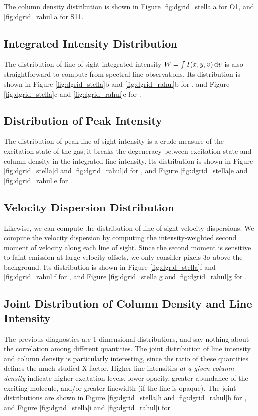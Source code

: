 The column density distribution is shown in Figure \ref{fig:dgrid_stella}a for O1, and \ref{fig:dgrid_rahul}a for S11.

\subsection{Integrated Intensity Distribution}
The distribution of line-of-sight integrated intensity $W=\int I(x, y, v)\, {\rm d}v$  is also straightforward to compute from spectral line observations. Its distribution is shown in Figure  \ref{fig:dgrid_stella}b and \ref{fig:dgrid_rahul}b for \coa, and  Figure \ref{fig:dgrid_stella}c and \ref{fig:dgrid_rahul}c for \coc.

\subsection{Distribution of Peak Intensity}
The distribution of peak line-of-sight intensity is a crude measure of the excitation state of the gas; it breaks the degeneracy between excitation state and column density in the integrated line intensity. Its distribution is shown in Figure  \ref{fig:dgrid_stella}d and \ref{fig:dgrid_rahul}d for \coa, and  Figure \ref{fig:dgrid_stella}e and \ref{fig:dgrid_rahul}e for \coc.

\subsection{Velocity Dispersion Distribution}
Likewise, we can compute the distribution of line-of-sight velocity dispersions. We compute the velocity dispersion by computing the intensity-weighted second moment of velocity along each line of sight. Since the second moment is sensitive to faint emission at large velocity offsets, we only consider pixels 3$\sigma$ above the background. Its distribution is shown in Figure  \ref{fig:dgrid_stella}f and \ref{fig:dgrid_rahul}f for \coa, and  Figure \ref{fig:dgrid_stella}g and \ref{fig:dgrid_rahul}g for \coc.

\subsection{Joint Distribution of Column Density and Line Intensity}
The previous diagnostics are 1-dimensional distributions, and say nothing about the correlation among different quantities. The joint distribution of line intensity and column density is particularly interesting, since the ratio of these quantities defines the much-studied X-factor. Higher line intensities \textit{at a given column density} indicate higher excitation levels, lower opacity, greater abundance of the exciting molecule, and/or greater linewidth (if the line is opaque). The joint distributions are shown in Figure  \ref{fig:dgrid_stella}h and \ref{fig:dgrid_rahul}h for \coa, and  Figure \ref{fig:dgrid_stella}i and \ref{fig:dgrid_rahul}i for \coc.


